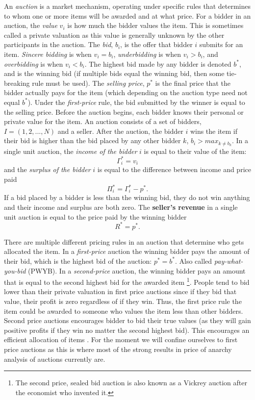 \documentclass[12pt,twoside]{reedthesis}
\begin{document}
An \textit{auction} is a market mechanism, operating under specific rules that determines to whom one or more items will be awarded and at what price. For a bidder in an auction, the \textit{value} $v_i$ is how much the bidder values the item. This is sometimes called a private valuation as this value is generally unknown by the other participants in the auction. The \textit{bid}, $b_i$, is the offer that bidder $i$ submits for an item. \textit{Sincere bidding} is when $v_i = b_i$, \textit{underbidding} is when $v_i > b_i$, and \textit{overbidding} is when $v_i < b_i$. The highest bid made by any bidder is denoted $b^*$, and is the winning bid (if multiple bids equal the winning bid, then some tie-breaking rule must be used). The \textit{selling price}, $p^*$ is the final price that the bidder actually pays for the item (which depending on the auction type need not equal $b^*$). Under the \textit{first-price} rule, the bid submitted by the winner is equal to the selling price. Before the auction begins, each bidder knows their personal or private value for the item. An auction consists of a set of bidders, $I = (1,2, ...,N)$ and a seller. After the auction, the bidder $i$ wins the item if their bid is higher than the bid placed by any other bidder $k$, $b_i > max_{k \neq b_k}$. In a single unit auction, the \textit{income of the bidder} $i$ is equal to their value of the item: $$ \Gamma_i^* = v_i$$ and the \textit{surplus of the bidder} $i$ is equal to the difference between income and price paid $$ \Pi_i^* = \Gamma_i^* - p^*.$$ If a bid placed by a bidder is less than the winning bid, they do not win anything and their income and surplus are both zero. The \textbf{seller's revenue} in a single unit auction is equal to the price paid by the winning bidder $$ R^* = p^*.$$ 

There are multiple different pricing rules in an auction that determine who gets allocated the item. In a \textit{first-price} auction the winning bidder pays the amount of their bid, which is the highest bid of the auction: $p^* = b^*$. Also called \textit{pay-what-you-bid} (PWYB). In a \textit{second-price} auction, the winning bidder pays an amount that is equal to the second highest bid for the awarded item \citep{Vickrey1961} \footnote{The second price, sealed bid auction is also known as a Vickrey auction after the economist who invented it.}. People tend to bid lower than their private valuation in first price auctions since if they bid that value, their profit is zero regardless of if they win. Thus, the first price rule the item could be awarded to someone who values the item less than other bidders. Second price auctions encourages bidder to bid their true values (as they will gain positive profits if they win no matter the second highest bid). This encourages an efficient allocation of items \citep{Mochon2015}. For the moment we will confine ourselves to first price auctions as this is where most of the strong results in price of anarchy analysis of auctions currently are.
\end{document}
